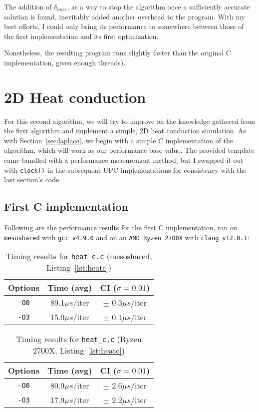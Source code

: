 \documentclass[12pt]{article}
\newcommand{\us}[0]{${\mu}s$}
\begin{document}
The addition of $\delta_{max}$, as a way to stop the algorithm once a sufficiently accurate solution is found, inevitably added another overhead to the program.
With my best efforts, I could only bring its performance to somewhere between those of the first implementation and its first optimization.

Nonetheless, the resulting program runs slightly faster than the original C implementation, given enough threads).

\section{2D Heat conduction}

For this second algorithm, we will try to improve on the knowledge gathered from the first algorithm and implement a simple, 2D heat conduction simulation.
As with Section~\ref{sec:laplace}, we begin with a simple C implementation of the algorithm, which will work as our performance base value.
The provided template came bundled with a performance measurement method, but I swapped it out with \texttt{clock()} in the subsequent UPC implementations for consistency with the last section's code.

\subsection{First C implementation}

Following are the performance results for the first C implementation, ran on \texttt{mesoshared} with \texttt{gcc v4.9.0} and on an \texttt{AMD Ryzen 2700X} with \texttt{clang v12.0.1}:

\begin{table}[h]
  \centering\begin{tabular}{|c|c|c|}
    \hline
    Options & Time (avg) & CI ($\sigma=0.01$) \\
    \hline
    \texttt{-O0} & 89.1\us/iter & $\pm$ 0.3\us/iter \\
    \texttt{-O3} & 15.0\us/iter & $\pm$ 0.1\us/iter \\
    \hline
  \end{tabular}
  \caption{Timing results for \texttt{heat\_c.c} (mesoshared, Listing~\ref{lst:heatc})}
  \label{tab:heatc}
\end{table}

\begin{table}[h]
  \centering\begin{tabular}{|c|c|c|}
    \hline
    Options & Time (avg) & CI ($\sigma=0.01$) \\
    \hline
    \texttt{-O0} & 80.9\us/iter & $\pm$ 2.6\us/iter \\
    \texttt{-O3} & 17.9\us/iter & $\pm$ 2.2\us/iter \\
    \hline
  \end{tabular}
  \caption{Timing results for \texttt{heat\_c.c} (Ryzen 2700X, Listing~\ref{lst:heatc})}
  \label{tab:heatcr}
\end{table}
\end{document}
